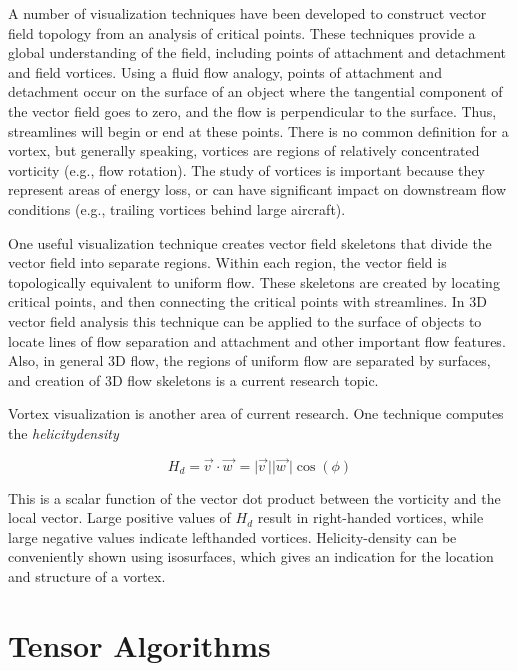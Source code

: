 A number of visualization techniques have been developed to construct vector field topology from an analysis of critical points. These techniques provide a global understanding of the field, including points of attachment and detachment and field vortices. Using a fluid flow analogy, points of attachment and detachment occur on the surface of an object where the tangential component of the vector field goes to zero, and the flow is perpendicular to the surface. Thus, streamlines will begin or end at these points. There is no common definition for a vortex, but generally speaking, vortices are regions of relatively concentrated vorticity (e.g., flow rotation). The study of vortices is important because they represent areas of energy loss, or can have significant impact on downstream flow conditions (e.g., trailing vortices behind large aircraft).

One useful visualization technique creates vector field skeletons that divide the vector field into separate regions. Within each region, the vector field is topologically equivalent to uniform flow. These skeletons are created by locating critical points, and then connecting the critical points with streamlines. In 3D vector field analysis this technique can be applied to the surface of objects to locate lines of flow separation and attachment and other important flow features. Also, in general 3D flow, the regions of uniform flow are separated by surfaces, and creation of 3D flow skeletons is a current research topic.

Vortex visualization is another area of current research. One technique computes the \emph{helicitydensity}

\begin{equation}\label{eq:9.12}
H_d = \overrightarrow{v\ } \cdot \overrightarrow{w\ } = \vert \overrightarrow{v\ } \vert \vert \overrightarrow{w\ } \vert \cos(\phi)
\end{equation}

This is a scalar function of the vector dot product between the vorticity and the local vector. Large positive values of $H_d$ result in right-handed vortices, while large negative values indicate lefthanded vortices. Helicity-density can be conveniently shown using isosurfaces, which gives an indication for the location and structure of a vortex.

\section{Tensor Algorithms}


